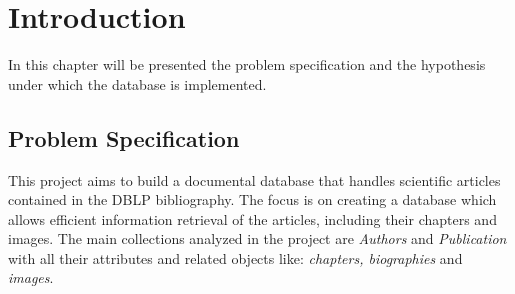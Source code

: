 \documentclass{Configuration_Files/PoliMi3i_thesis}
\begin{document}


\pagestyle{empty} %
\frontmatter %


\startpreamble
\setcounter{page}{1} %


\thispagestyle{empty}
\tableofcontents %
\thispagestyle{empty}
\cleardoublepage

\mainmatter %

\chapter{Introduction}
\label{ch:introduction}
In this chapter will be presented the problem specification and the hypothesis under which the database is implemented.

\section{Problem Specification}
This project aims to build a documental database that handles scientific articles contained in the DBLP bibliography.
The focus is on creating a database which allows efficient information retrieval of the articles, including
their chapters and images.
The main collections analyzed in the project are \emph{Authors} and \emph{Publication} with all their attributes and related
objects like: \emph{chapters, biographies} and \emph{images}.
\end{document}
